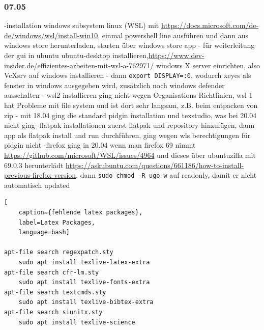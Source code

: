 \documentclass[english,runningheads,a4paper]{llncs}[2018/03/10]
\begin{document}
\subsubsection{07.05}
-installation windows subsystem linux (WSL) mit \url{https://docs.microsoft.com/de-de/windows/wsl/install-win10}, einmal powershell line ausführen und dann aus windows store herunterladen, starten über windows store app
- für weiterleitung der gui in ubuntu ubuntu-desktop installieren,\url{https://www.dev-insider.de/effizientes-arbeiten-mit-wsl-a-762971/} windows X server einrichten, also VcXsrv auf windows installieren
- dann \texttt{export DISPLAY=:0}, wodurch xeyes als fenster in windows ausgegeben wird, zusätzlich noch windows defender ausschalten
- wsl2 installieren ging nicht wegen Organisations Richtlinien, wsl 1 hat Probleme mit file system  und ist dort sehr langsam, z.B. beim entpacken von zip
- mit 18.04 ging die standard pidgin installation und texstudio, was bei 20.04 nicht ging
-flatpak installationen zuerst flatpak und repository hinzufügen, dann app als flatpak install und run durchführen, ging wegen wls berechtigungen für pidgin nicht
-firefox ging in 20.04 wenn man firefox 69 nimmt \url{https://github.com/microsoft/WSL/issues/4964} und dieses über ubuntuzilla mit 69.0.3 herunterlädt \url{https://askubuntu.com/questions/661186/how-to-install-previous-firefox-version}, dann \texttt{sudo chmod -R ugo-w}  auf readonly, damit er nicht automatisch updated
\begin{lstlisting}[
	caption={fehlende latex packages},
	label=Latex Packages,
	language=bash]

apt-file search regexpatch.sty
	sudo apt install texlive-latex-extra              
apt-file search cfr-lm.sty  
	sudo apt install texlive-fonts-extra 
apt-file search textcmds.sty  
	sudo apt install texlive-bibtex-extra   
apt-file search siunitx.sty 
	sudo apt install texlive-science
\end{lstlisting}
\end{document}
